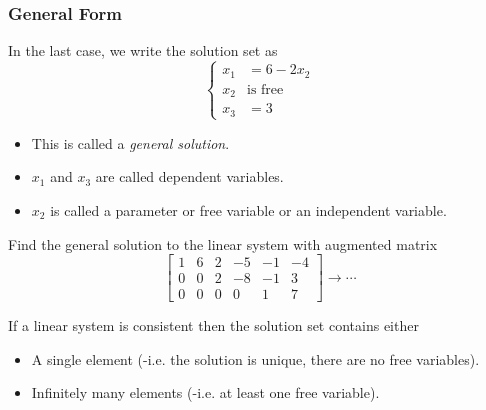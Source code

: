   \begin{frame}[fragile]\frametitle{General Form}
 In the last case, we write the solution set as 
 \[
  \left\{ 
  \begin{array}{rl}
   x_1 & =  6-2x_2 \\
   x_2 &  \mbox{is free}\\
   x_3 & =  3
  \end{array}
  \right.
 \]

\begin{itemize} 
\item This is called a {\em general solution}.
\item  $x_1$ and $x_3$ are called dependent variables.
\item $x_2$ is called a parameter or free variable or an independent variable.
\end{itemize}

\end{frame}

  \begin{frame}[fragile]
 Find the general solution to the linear system with augmented matrix
 \begin{equation*}
   \left[\begin{array}{rrrrrr}
   1 & 6 & 2 & -5 & -1 & -4 \\
   0 & 0 & 2 & -8 & -1 & 3 \\
   0 & 0 & 0 & 0  & 1  & 7
  \end{array}\right]
  \rightarrow \cdots
 \end{equation*}

\end{frame}


  \begin{frame}[fragile]
If a linear system is consistent then the solution set contains
either  
\begin{itemize}
\item A single element (-i.e. the solution is unique, there are no free variables).  
\item Infinitely many elements (-i.e. at least one free variable).
\end{itemize}
\end{frame}



